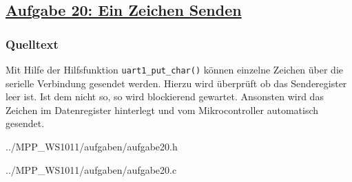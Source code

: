 \subsection*
{\href{http://cst.mi.fu-berlin.de/intern/19606-P-MPP/Aufgaben/040701.html}
{Aufgabe 20: Ein Zeichen Senden}}

\subsubsection*{Quelltext}
Mit Hilfe der Hilfsfunktion \texttt{uart1\_put\_char()} können einzelne Zeichen über die serielle Verbindung gesendet werden. Hierzu wird überprüft ob das Senderegister leer ist. Ist dem nicht so, so wird blockierend gewartet. Ansonsten wird das Zeichen im Datenregister hinterlegt und vom Mikrocontroller automatisch gesendet.

{../MPP_WS1011/aufgaben/aufgabe20.h}

{../MPP_WS1011/aufgaben/aufgabe20.c}
